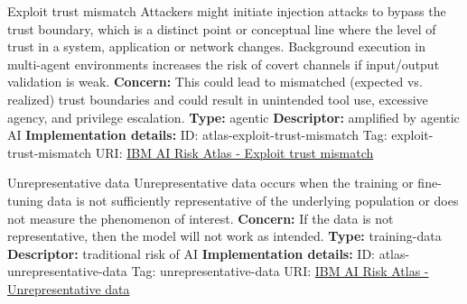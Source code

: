 \begin{definitionbox}{Exploit trust mismatch}
Attackers might initiate injection attacks to bypass the trust boundary, which is a distinct point or conceptual line where the level of trust in a system, application or network changes. Background execution in multi-agent environments increases the risk of covert channels if input/output validation is weak.\newline\newline
\textbf{Concern: }This could lead to mismatched (expected vs. realized) trust boundaries and could result in unintended tool use, excessive agency, and privilege escalation.\newline\newline
\textbf{Type: }agentic\newline
\textbf{Descriptor: }amplified by agentic AI \newline\newline
\textbf{Implementation details: } \newline
ID: atlas-exploit-trust-mismatch \newline
Tag: exploit-trust-mismatch \newline
URI:  \href{https://www.ibm.com/docs/en/watsonx/saas?topic=SSYOK8/wsj/ai-risk-atlas/exploit-trust-mismatch.html}{IBM AI Risk Atlas - Exploit trust mismatch}\newline
\end{definitionbox}
\begin{definitionbox}{Unrepresentative data}
Unrepresentative data occurs when the training or fine-tuning data is not sufficiently representative of the underlying population or does not measure the phenomenon of interest.\newline\newline
\textbf{Concern: }If the data is not representative, then the model will not work as intended.\newline\newline
\textbf{Type: }training-data\newline
\textbf{Descriptor: }traditional risk of AI \newline\newline
\textbf{Implementation details: } \newline
ID: atlas-unrepresentative-data \newline
Tag: unrepresentative-data \newline
URI:  \href{https://www.ibm.com/docs/en/watsonx/saas?topic=SSYOK8/wsj/ai-risk-atlas/unrepresentative-data.html}{IBM AI Risk Atlas - Unrepresentative data}\newline
\end{definitionbox}

